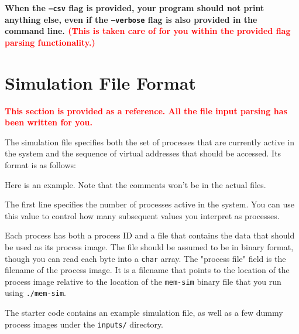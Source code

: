 \documentclass[10pt]{article}
\begin{document}


\textbf{When the \texttt{--csv} flag is provided, your program should not print anything else, even if the \texttt{--verbose} flag is also provided in the command line. \textcolor{red}{(This is taken care of for you within the provided flag parsing functionality.)}} 



\section{Simulation File Format}

\textcolor{red}{\textbf{This section is provided as a reference. All the file input parsing has been written for you.}}

The simulation file specifies both the set of processes that are currently active in the system and the sequence of virtual addresses that should be accessed. Its format is as follows:



Here is an example. Note that the comments won't be in the actual files.



The first line specifies the number of processes active in the system. You can use this value to control how many subsequent values you interpret as processes.

Each process has both a process ID and a file that contains the data that should be used as its process image. The file should be assumed to be in binary format, though you can read each byte into a \texttt{char} array. The "process file" field is the filename of the process image. It is a filename that points to the location of the process image relative to the location of the \texttt{mem-sim} binary file that you run using \texttt{./mem-sim}.

The starter code contains an example simulation file, as well as a few dummy process images under the \texttt{inputs/} directory.
\end{document}
